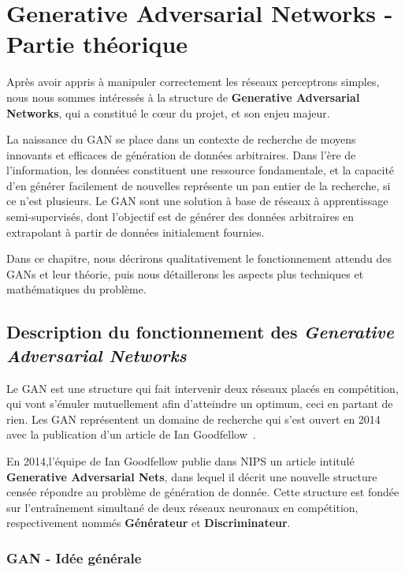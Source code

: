 \chapter{Generative Adversarial Networks - Partie théorique}

Après avoir appris à manipuler correctement les réseaux perceptrons simples, nous nous sommes intéressés à la structure de \textbf{Generative Adversarial Networks}, qui a constitué le cœur du projet, et son enjeu majeur. 

La naissance du GAN se place dans un contexte de recherche de moyens innovants et efficaces de génération de données arbitraires. Dans l'ère de l'information, les données constituent une ressource fondamentale, et la capacité d'en générer facilement de nouvelles représente un pan entier de la recherche, si ce n'est plusieurs. Le GAN sont une solution à base de réseaux à apprentissage semi-supervisés, dont l'objectif est de générer des données arbitraires en extrapolant à partir de données initialement fournies.

Dans ce chapitre, nous décrirons qualitativement le fonctionnement attendu des GANs et leur théorie, puis nous détaillerons les aspects plus techniques et mathématiques du problème. 

\section{Description du fonctionnement des \textit{Generative Adversarial Networks}}

Le GAN est une structure qui fait intervenir deux réseaux placés en compétition, qui vont s'émuler mutuellement afin d'atteindre un optimum, ceci en partant de rien. Les GAN représentent un domaine de recherche qui s'est ouvert en 2014 avec la publication d'un article de Ian Goodfellow \cite{goodfellow_generative_2014}.

En 2014,l'équipe de Ian Goodfellow publie dans NIPS un article intitulé \textbf{Generative Adversarial Nets}, dans lequel il décrit une nouvelle structure censée répondre au problème de génération de donnée. Cette structure est fondée sur l'entraînement simultané de deux réseaux neuronaux en compétition, respectivement nommés \textbf{Générateur} et \textbf{Discriminateur}.  

\subsection{GAN - Idée générale}

